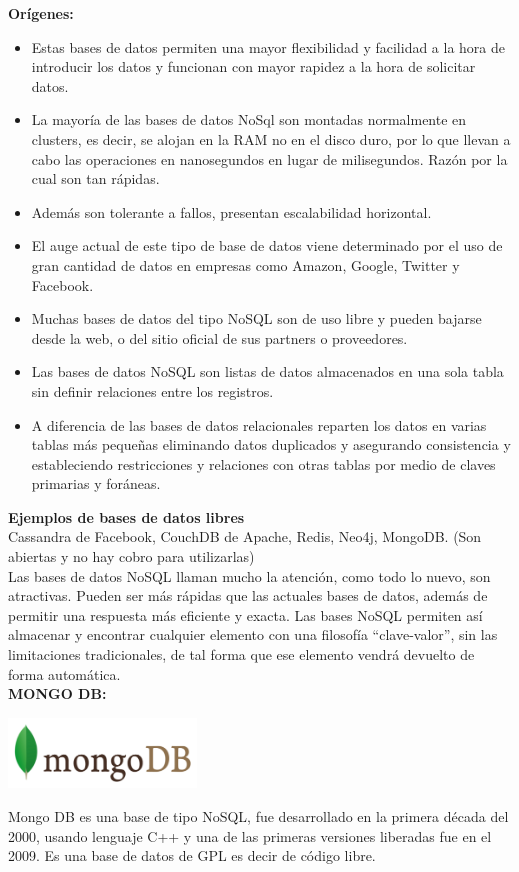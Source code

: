 \documentclass[twoside,twocolumn]{article}
\begin{document}
\textbf{Orígenes:}\\
\begin{itemize}
    \item Estas bases de datos permiten una mayor flexibilidad y facilidad a la hora de introducir los datos y funcionan con mayor rapidez a la hora de solicitar datos. 
    \item La mayoría de las bases de datos NoSql son montadas normalmente en clusters, es decir, se alojan en la RAM no en el disco duro, por lo que llevan a cabo las operaciones en nanosegundos en lugar de milisegundos. Razón por la cual son tan rápidas.
    \item Además son tolerante a fallos, presentan escalabilidad horizontal.
    \item El auge actual de este tipo de base de datos viene determinado por el uso de gran cantidad de datos en empresas como Amazon, Google, Twitter y Facebook.
    \item Muchas bases de datos del tipo NoSQL son de uso libre y pueden bajarse desde la web, o del sitio oficial de sus partners o proveedores.
    \item Las bases de datos NoSQL son listas de datos almacenados en una sola tabla sin definir relaciones entre los registros.
    \item A diferencia de las bases de datos relacionales reparten los datos en varias tablas más pequeñas eliminando datos duplicados y asegurando consistencia y estableciendo restricciones y relaciones con otras tablas por medio de claves primarias y foráneas.
\end{itemize}

\textbf{Ejemplos de bases de datos libres}\\
Cassandra de Facebook, CouchDB de Apache, Redis, Neo4j, MongoDB. (Son abiertas y no hay cobro para utilizarlas)\\
Las bases de datos NoSQL llaman mucho la atención, como todo lo nuevo, son atractivas. Pueden ser  más rápidas que las actuales bases de datos, además de permitir una respuesta más eficiente y exacta.   Las bases NoSQL permiten así almacenar y encontrar cualquier elemento con una filosofía  “clave-valor”, sin las limitaciones tradicionales, de tal forma que ese elemento vendrá devuelto de forma automática. 
\\

\textbf{MONGO DB:}\\
\begin{center}
	\includegraphics[width=5cm]{./img/1.png} 
\end{center}
Mongo DB es una base de tipo NoSQL, fue desarrollado en la primera década del 2000, usando lenguaje C++ y una de las primeras versiones liberadas fue en el 2009.  
Es una base de datos de GPL es decir de código libre.\\
\end{document}
